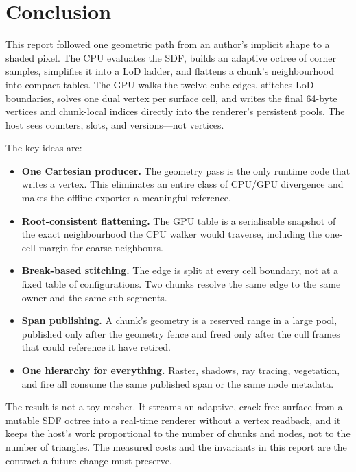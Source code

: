\section{Conclusion}
\label{sec:conclusion}

This report followed one geometric path from an author's implicit shape to
a shaded pixel.  The CPU evaluates the SDF, builds an adaptive octree of
corner samples, simplifies it into a LoD ladder, and flattens a chunk's
neighbourhood into compact tables.  The GPU walks the twelve cube edges,
stitches LoD boundaries, solves one dual vertex per surface cell, and
writes the final 64-byte vertices and chunk-local indices directly into
the renderer's persistent pools.  The host sees counters, slots, and
versions—not vertices.

The key ideas are:
\begin{itemize}
\item \textbf{One Cartesian producer.}  The geometry pass is the only runtime code
  that writes a vertex.  This eliminates an entire class of
  CPU/GPU divergence and makes the offline exporter a meaningful
  reference.
\item \textbf{Root-consistent flattening.}  The GPU table is a
  serialisable snapshot of the exact neighbourhood the CPU walker would
  traverse, including the one-cell margin for coarse neighbours.
\item \textbf{Break-based stitching.}  The edge is split at every cell
  boundary, not at a fixed table of configurations.  Two chunks resolve
  the same edge to the same owner and the same sub-segments.
\item \textbf{Span publishing.}  A chunk's geometry is a reserved range in
  a large pool, published only after the geometry fence and freed only
  after the cull frames that could reference it have retired.
\item \textbf{One hierarchy for everything.}  Raster, shadows, ray
  tracing, vegetation, and fire all consume the same published span or the
  same node metadata.
\end{itemize}

The result is not a toy mesher.  It streams an adaptive, crack-free
surface from a mutable SDF octree into a real-time renderer without a
vertex readback, and it keeps the host's work proportional to the number
of chunks and nodes, not to the number of triangles.  The measured costs
and the invariants in this report are the contract a future change must
preserve.
